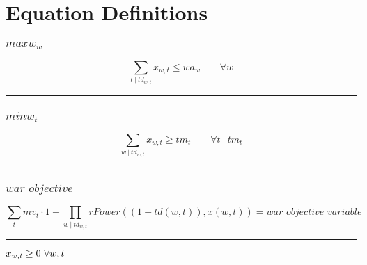 \documentclass[11pt]{article}
\begin{document}
\section*{Equation Definitions}
\subsubsection*{$maxw_{w}$}
\begin{equation*}
\sum_{t ~ | ~ td_{w,t}} x_{w,t} \leq wa_{w}\qquad \forall w
\end{equation*}
\vspace{5pt}
\hrule
\subsubsection*{$minw_{t}$}
\begin{equation*}
\sum_{w ~ | ~ td_{w,t}} x_{w,t} \geq tm_{t}\qquad \forall t ~ | ~ tm_{t}
\end{equation*}
\vspace{5pt}
\hrule
\subsubsection*{$war\_objective$}
\begin{equation*}
\sum_{t} mv_{t} \cdot 1 - \prod_{w ~ | ~ td_{w,t}}  rPower((1 - td(w,t)),x(w,t))  = war\_objective\_variable
\end{equation*}
\vspace{5pt}
\hrule
\bigskip
$x_{w,t}\geq 0 ~ \forall w,t\\$
\end{document}
